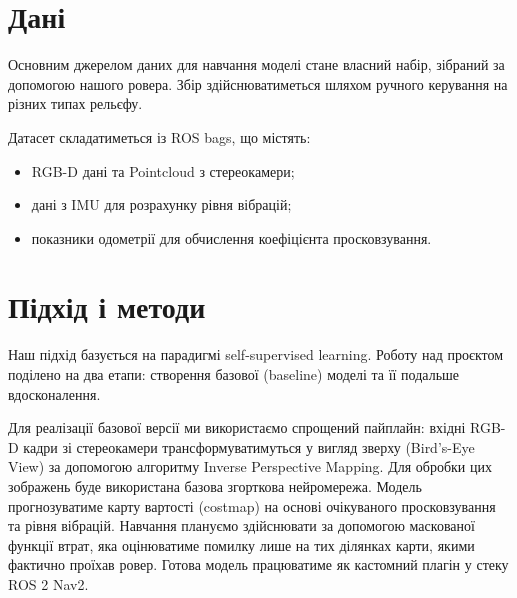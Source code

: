 \documentclass[ukrainian]{ucuproposal}
\begin{document}
\section{Дані}
Основним джерелом даних для навчання моделі стане власний набір, зібраний за допомогою нашого ровера. Збір здійснюватиметься шляхом ручного керування на різних типах рельєфу.

Датасет складатиметься із ROS bags, що містять:
\begin{itemize}
	\item RGB-D дані та Pointcloud з стереокамери;
	\item дані з IMU для розрахунку рівня вібрацій;
	\item показники одометрії для обчислення коефіцієнта просковзування.
\end{itemize}

\section{Підхід і методи}\label{sec:approach}

Наш підхід базується на парадигмі self-supervised learning. Роботу над проєктом поділено на два етапи: створення базової (baseline) моделі та її подальше вдосконалення.

Для реалізації базової версії ми використаємо спрощений пайплайн:
вхідні RGB-D кадри зі стереокамери трансформуватимуться у вигляд зверху (Bird's-Eye View) за допомогою алгоритму Inverse Perspective Mapping. Для обробки цих зображень буде використана базова згорткова нейромережа. Модель прогнозуватиме карту вартості (costmap) на основі очікуваного просковзування та рівня вібрацій. Навчання плануємо здійснювати за допомогою маскованої функції втрат, яка оцінюватиме помилку лише на тих ділянках карти, якими фактично проїхав ровер. Готова модель працюватиме як кастомний плагін у стеку ROS 2 Nav2.
\end{document}
